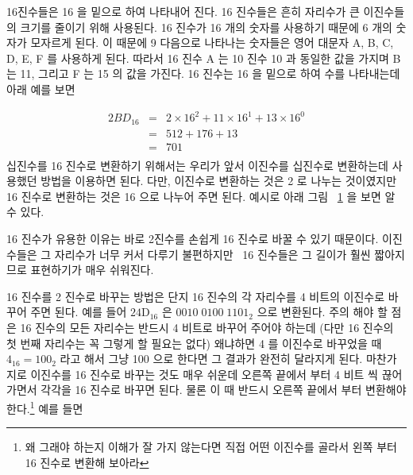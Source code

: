   16진수들은 16 을 밑으로 하여 나타내어 진다. 16 진수들은 흔히 자리수가 큰 이진수들의 크기를 줄이기 위해
  사용된다. 16 진수가 16 개의 숫자를 사용하기 때문에 6 개의 숫자가 모자르게 된다. 이 때문에 9 다음으로
  나타나는 숫자들은 영어 대문자 A, B, C, D, E, F 를 사용하게 된다. 따라서 16 진수 A 는 10 진수 10 과 동일한
  값을 가지며 B 는 11, 그리고 F 는 15 의 값을 가진다. 16 진수는 16 을 밑으로 하여 수를 나타내는데 아래 예를 보면
  
\begin{eqnarray*}
2BD_{16} & = & 2 \times 16^2 + 11 \times 16^1 + 13 \times 16^0 \\
         & = & 512 + 176 + 13 \\
         & = & 701 \\
\end{eqnarray*}
십진수를 16 진수로 변환하기 위해서는 우리가 앞서 이진수를 십진수로 변환하는데 사용했던 방법을 이용하면
된다. 다만, 이진수로 변환하는 것은 2 로 나누는 것이였지만 16 진수로 변환하는 것은 16 으로 나누어 주면 된다.
예시로 아래 그림 ~\ref{fig:hex-conv} 을 보면 알 수 있다. 

\begin{figure}[t]
\centering
{}
\caption{\label{fig:hex-conv}}
\end{figure}

16 진수가 유용한 이유는 바로 2진수를 손쉽게 16 진수로 바꿀 수 있기 때문이다. 이진수들은 그 자리수가
너무 커서 다루기 불편하지만 ~16 진수들은 그 길이가 훨씬 짧아지므로 표현하기가 매우 쉬워진다. 

16 진수를 2 진수로 바꾸는 방법은 단지 16 진수의 각 자리수를 4 비트의 이진수로 바꾸어 주면 된다. 
예를 들어 $\mathrm{24D}_{16}$ 은 \mbox{$0010\;0100\; 1101_2$} 으로 변환된다. 주의 해야 할 점은
16 진수의 모든 자리수는 반드시 4 비트로 바꾸어 주어야 하는데 (다만 16 진수의 첫 번째 자리수는 꼭
그렇게 할 필요는 없다) 왜냐하면 4 를 이진수로 바꾸었을 때 $\mathrm{4}_{16} = {100}_{2}$ 라고 해서
그냥 100 으로 한다면 그 결과가 완전히 달라지게 된다. 
마찬가지로 이진수를 16 진수로 바꾸는 것도 매우 쉬운데 오른쪽 끝에서 부터 4 비트 씩 끊어 가면서 
각각을 16 진수로 바꾸면 된다. 물론 이 때 반드시 오른쪽 끝에서 부터 변환해야 한다.\footnote{왜 그래야
하는지 이해가 잘 가지 않는다면 직접 어떤 이진수를 골라서 왼쪽 부터 16 진수로 변환해 보아라} 
예를 들면 \newline

